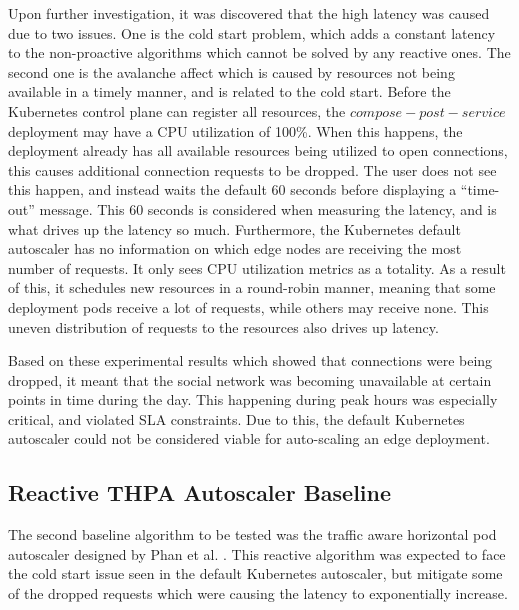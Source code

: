 Upon further investigation, it was discovered that the high latency was caused due to two issues. One is the cold start problem, which adds a constant latency to the non-proactive algorithms which cannot be solved by any reactive ones. The second one is the avalanche affect which is caused by resources not being available in a timely manner, and is related to the cold start. Before the Kubernetes control plane can register all resources, the $compose-post-service$ deployment may have a CPU utilization of 100\%. When this happens, the deployment already has all available resources being utilized to open connections, this causes additional connection requests to be dropped. The user does not see this happen, and instead waits the default 60 seconds before displaying a ``time-out'' message. This 60 seconds is considered when measuring the latency, and is what drives up the latency so much. Furthermore, the Kubernetes default autoscaler has no information on which edge nodes are receiving the most number of requests. It only sees CPU utilization metrics as a totality. As a result of this, it schedules new resources in a round-robin manner, meaning that some deployment pods receive a lot of requests, while others may receive none. This uneven distribution of requests to the resources also drives up latency.\par

Based on these experimental results which showed that connections were being dropped, it meant that the social network was becoming unavailable at certain points in time during the day. This happening during peak hours was especially critical, and violated SLA constraints. Due to this, the default Kubernetes autoscaler could not be considered viable for auto-scaling an edge deployment.

\subsection {Reactive THPA Autoscaler Baseline}
\label{subsec:ch5-exp2-reactive-algo}

The second baseline algorithm to be tested was the traffic aware horizontal pod autoscaler designed by Phan et al. \cite{phan2022traffic}. This reactive algorithm was expected to face the cold start issue seen in the default Kubernetes autoscaler, but mitigate some of the dropped requests which were causing the latency to exponentially increase.\par

